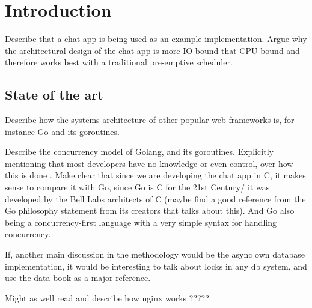 \section{Introduction}
Describe that a chat app is being used as an example implementation. Argue why the architectural design of the chat app is more IO-bound that CPU-bound \cite{Kennedy2018} and therefore works best with a traditional pre-emptive scheduler.
\subsection{State of the art}
Describe how the systems architecture of other popular web frameworks is, for instance Go and its goroutines.

Describe the concurrency model of Golang, and its goroutines. Explicitly mentioning that most developers have no knowledge or even control, over how this is done \cite{Cox-Buday2017}. Make clear that since we are developing the chat app in C, it makes sense to compare it with Go, since Go is C for the 21st Century/ it was developed by the Bell Labs architects of C (maybe find a good reference from the Go philosophy statement from its creators that talks about this). And Go also being a concurrency-first language with a very simple syntax for handling concurrency.

If, another main discussion in the methodology would be the async own database implementation, it would be interesting to talk about locks in any db system, and use the data book as a major reference.

Might as well read and describe how nginx works ?????

